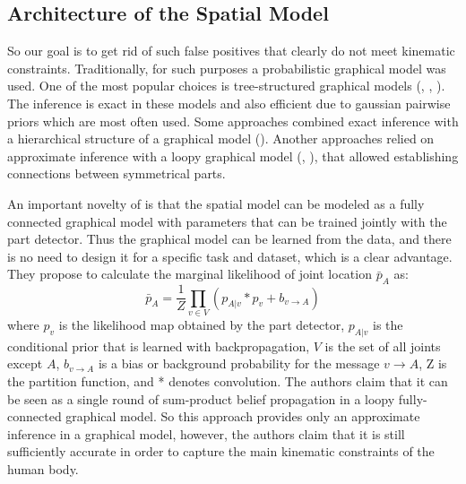 \documentclass[a4paper,10pt]{article}
\begin{document}
	\subsection{Architecture of the Spatial Model}
	So our goal is to get rid of such false positives that clearly do not meet kinematic constraints. Traditionally, for such purposes a probabilistic graphical model was used. One of the most popular choices is tree-structured graphical models (\cite{andriluka2009pictorial}, \cite{pishchulin2013strong}, \cite{pishchulin2013poselet}). The inference is exact in these models and also efficient due to gaussian pairwise priors which are most often used. Some approaches combined exact inference with a hierarchical structure of a graphical model (\cite{tian2012exploring}). Another approaches relied on approximate inference with a loopy graphical model (\cite{lan2005beyond}, \cite{karlinsky2012using}), that allowed establishing connections between symmetrical parts.
	
	An important novelty of \cite{cnn_pgm_for_hpe} is that the spatial model can be modeled as a fully connected graphical model with parameters that can be trained jointly with the part detector. Thus the graphical model can be learned from the data, and there is no need to design it for a specific task and dataset, which is a clear advantage. They propose to calculate the marginal likelihood of joint location $\bar{p}_A$ as:
	\begin{equation*}
		\bar{p}_A = \frac{1}{Z} \prod_{v \in V} (p_{A|v} * p_v + b_{v \rightarrow A})
	\end{equation*}
	where $p_v$ is the likelihood map obtained by the part detector, $p_{A|v}$ is the conditional prior that is learned with backpropagation, $V$ is the set of all joints except $A$, $b_{v \rightarrow A}$ is a bias or background probability for the message $v \rightarrow A$, Z is the partition function, and * denotes convolution. The authors claim that it can be seen as a single round of sum-product belief propagation in a loopy fully-connected graphical model. So this approach provides only an approximate inference in a graphical model, however, the authors claim that it is still sufficiently accurate in order to capture the main kinematic constraints of the human body.
	
\end{document}
